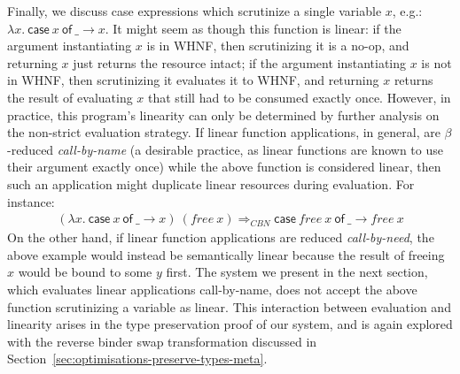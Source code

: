 \documentclass[acmsmall,review,anonymous,screen]{acmart}
\newcommand{\parawith}[1]{\paragraph{\emph{#1}}}
\newcommand{\ccase}[2]{\mathsf{case}~#1~\mathsf{of}~#2}
\begin{document}
Finally, we discuss case expressions which scrutinize a
single variable $x$, e.g.:
$
\lambda x.~\ccase{x}{\_ \to x}
$. 
It might seem as though this function is linear:
if the argument instantiating $x$ is in WHNF, then scrutinizing it is a no-op, and returning $x$
just returns the resource intact;
if the argument instantiating $x$ is not in WHNF, then scrutinizing it evaluates it to WHNF, and returning
$x$ returns the result of evaluating $x$ that still had to be consumed exactly
once.
However, in practice, this program's linearity can only be determined by
further analysis on the non-strict evaluation strategy. If linear
function applications, in general, are $\beta$-reduced \emph{call-by-name} (a desirable
practice, as linear functions are known to use their argument exactly once)
while the above function is considered linear, then such an application might
duplicate linear resources during evaluation. For instance:
\[
\begin{array}{l}
(\lambda x.~\ccase{x}{\_ \to x})~(free~x)
\Longrightarrow_{CBN}
\ccase{free~x}{\_ \to free~x}
\end{array}
\]
On the other hand, if linear function applications are reduced
\emph{call-by-need}, the above example would instead be semantically linear
because the result of freeing $x$ would be bound to some $y$ first.
%
The system we present in the next section, which evaluates linear
applications call-by-name, does not accept the above function scrutinizing a
variable as linear. 
This interaction between evaluation and linearity arises in the type
preservation proof of our system, and is again explored with the reverse
binder swap transformation discussed in
Section~\ref{sec:optimisations-preserve-types-meta}.

\end{document}
